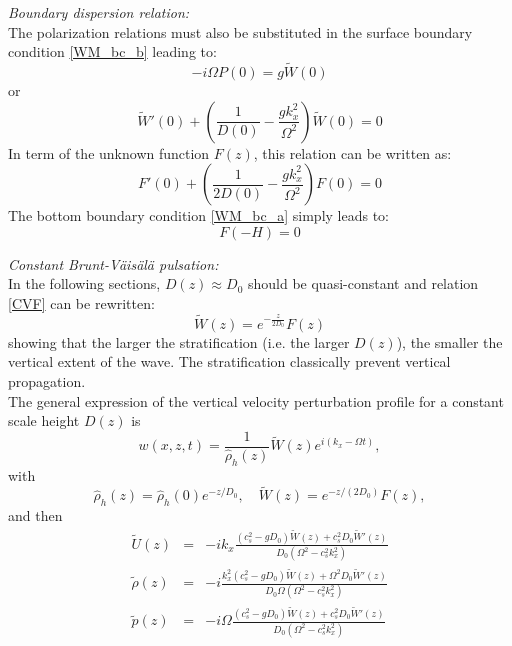 \documentclass[a4paper,11pt]{article}
\begin{document}
\textit{Boundary dispersion relation:}\\
The polarization relations must also be substituted in the surface boundary condition \ref{WM_bc_b} leading to:
\begin{equation}
  \displaystyle
  -i\Omega P(0)=g \widetilde{W}(0)
\end{equation}
or
\begin{equation}
  \displaystyle
  \widetilde{W}'(0)+\left(
  \frac{1}{D(0)}-\frac{gk_x^2}{\Omega^2}
  \right)\widetilde{W}(0)=0
\end{equation}
In term of the unknown function $F(z)$, this relation can be written as:
\begin{equation}
  \displaystyle
  F'(0)+\left(
  \frac{1}{2D(0)}-\frac{gk_x^2}{\Omega^2}
  \right)F(0)=0
  \label{eqFbc}
\end{equation}
The bottom boundary condition \ref{WM_bc_a} simply leads to:
\begin{equation}
  \displaystyle
  F(-H)=0
  \label{eqFbc2}
\end{equation}

\textit{Constant Brunt-Väisälä pulsation:}\\
In the following sections, $D(z)\approx D_0$ should be quasi-constant and relation \ref{CVF} can be rewritten:
\begin{equation}
  \displaystyle
  \widetilde{W}(z)=e^{-\frac{z}{2D_0}}F(z)
  \label{CVF2}
\end{equation}
showing that the larger the stratification (i.e. the larger $D(z)$), the smaller the vertical extent of the wave. The stratification classically prevent vertical propagation.\\
The general expression of the vertical velocity perturbation profile for a constant scale height $D(z)$ is
\begin{equation}
  \displaystyle
  w(x,z,t)=\frac{1}{\hat{\rho}_h(z)}\widetilde{W}(z)e^{i(k_x-\Omega t)},
\end{equation}
with 
\begin{equation}
  \displaystyle
  \hat{\rho}_h(z)=\hat{\rho}_h(0)e^{-z/D_0},\quad \widetilde{W}(z)=e^{-z/(2D_0)}F(z),
\end{equation}
and then
\begin{equation}
  \displaystyle
  \begin{array}{rcl}
    \widetilde{U}(z)&=&\displaystyle  -ik_x\frac{(c_s^2-gD_0)\widetilde{W}(z)+c_s^2D_0\widetilde{W}'(z)}{D_0(\Omega^2-c_s^2k_x^2)}\\[4mm]
    \widetilde{\rho}(z)&=&\displaystyle -i\frac{k_x^2(c_s^2-gD_0)\widetilde{W}(z)+\Omega^2D_0\widetilde{W}'(z)}{D_0\Omega(\Omega^2-c_s^2k_x^2)}\\[4mm]
    \widetilde{p}(z)&=&\displaystyle -i\Omega\frac{(c_s^2-gD_0)\widetilde{W}(z)+c_s^2D_0\widetilde{W}'(z)}{D_0(\Omega^2-c_s^2k_x^2)}
\end{array}
\end{equation}
\end{document}
